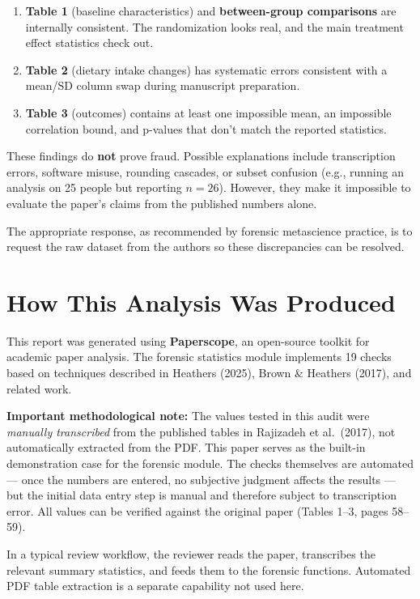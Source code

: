 \documentclass[11pt]{article}
\begin{document}
\begin{enumerate}[nosep]
\item \textbf{Table 1} (baseline characteristics) and \textbf{between-group comparisons} are internally consistent. The randomization looks real, and the main treatment effect statistics check out.
\item \textbf{Table 2} (dietary intake changes) has systematic errors consistent with a mean/SD column swap during manuscript preparation.
\item \textbf{Table 3} (outcomes) contains at least one impossible mean, an impossible correlation bound, and p-values that don't match the reported statistics.
\end{enumerate}

These findings do \textbf{not} prove fraud. Possible explanations include transcription errors, software misuse, rounding cascades, or subset confusion (e.g., running an analysis on 25 people but reporting $n = 26$). However, they make it impossible to evaluate the paper's claims from the published numbers alone.

The appropriate response, as recommended by forensic metascience practice, is to request the raw dataset from the authors so these discrepancies can be resolved.

\section{How This Analysis Was Produced}

This report was generated using \textbf{Paperscope}, an open-source toolkit for academic paper analysis. The forensic statistics module implements 19 checks based on techniques described in Heathers (2025), Brown \& Heathers (2017), and related work.

\textbf{Important methodological note:} The values tested in this audit were \textit{manually transcribed} from the published tables in Rajizadeh et al.\ (2017), not automatically extracted from the PDF. This paper serves as the built-in demonstration case for the forensic module. The checks themselves are automated --- once the numbers are entered, no subjective judgment affects the results --- but the initial data entry step is manual and therefore subject to transcription error. All values can be verified against the original paper (Tables 1--3, pages 58--59).

In a typical review workflow, the reviewer reads the paper, transcribes the relevant summary statistics, and feeds them to the forensic functions. Automated PDF table extraction is a separate capability not used here.
\end{document}
